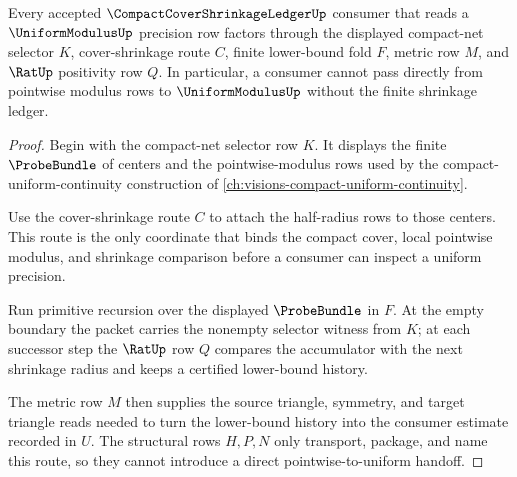 \begin{theorem}
\label{thm:compact-cover-shrinkage-ledger-uniform-modulus-handoff}
Every accepted $\CompactCoverShrinkageLedgerUp$ consumer that reads a $\UniformModulusUp$ precision row factors through the displayed compact-net selector $K$, cover-shrinkage route $C$, finite lower-bound fold $F$, metric row $M$, and $\RatUp$ positivity row $Q$. In particular, a consumer cannot pass directly from pointwise modulus rows to $\UniformModulusUp$ without the finite shrinkage ledger.
\end{theorem}
\begin{proof}
Begin with the compact-net selector row $K$. It displays the finite $\ProbeBundle$ of centers and the pointwise-modulus rows used by the compact-uniform-continuity construction of \autoref{ch:visions-compact-uniform-continuity}.

Use the cover-shrinkage route $C$ to attach the half-radius rows to those centers. This route is the only coordinate that binds the compact cover, local pointwise modulus, and shrinkage comparison before a consumer can inspect a uniform precision.

Run primitive recursion over the displayed $\ProbeBundle$ in $F$. At the empty boundary the packet carries the nonempty selector witness from $K$; at each successor step the $\RatUp$ row $Q$ compares the accumulator with the next shrinkage radius and keeps a certified lower-bound history.

The metric row $M$ then supplies the source triangle, symmetry, and target triangle reads needed to turn the lower-bound history into the consumer estimate recorded in $U$. The structural rows $H,P,N$ only transport, package, and name this route, so they cannot introduce a direct pointwise-to-uniform handoff.
\end{proof}



